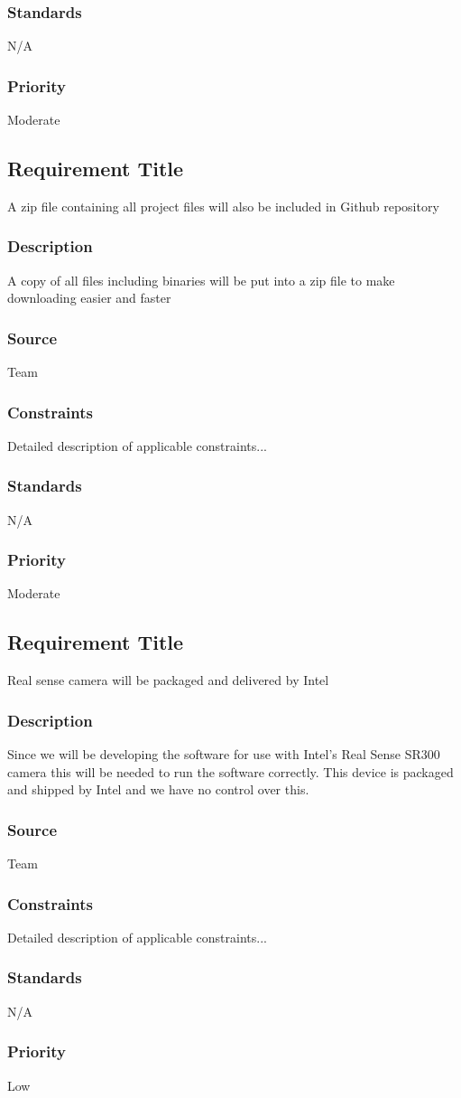 \subsubsection{Standards}
N/A
\subsubsection{Priority}
Moderate

\subsection{Requirement Title}
A zip file containing all project files will also be included in Github repository
\subsubsection{Description}
A copy of all files including binaries will be put into a zip file to make downloading easier and faster
\subsubsection{Source}
Team
\subsubsection{Constraints}
Detailed description of applicable constraints...
\subsubsection{Standards}
N/A
\subsubsection{Priority}
Moderate

\subsection{Requirement Title}
Real sense camera will be packaged and delivered by Intel
\subsubsection{Description}
Since we will be developing the software for use with Intel's Real Sense SR300 camera this will be needed to run the software correctly. This device is packaged and shipped by Intel and we have no control over this.
\subsubsection{Source}
Team
\subsubsection{Constraints}
Detailed description of applicable constraints...
\subsubsection{Standards}
N/A
\subsubsection{Priority}
Low